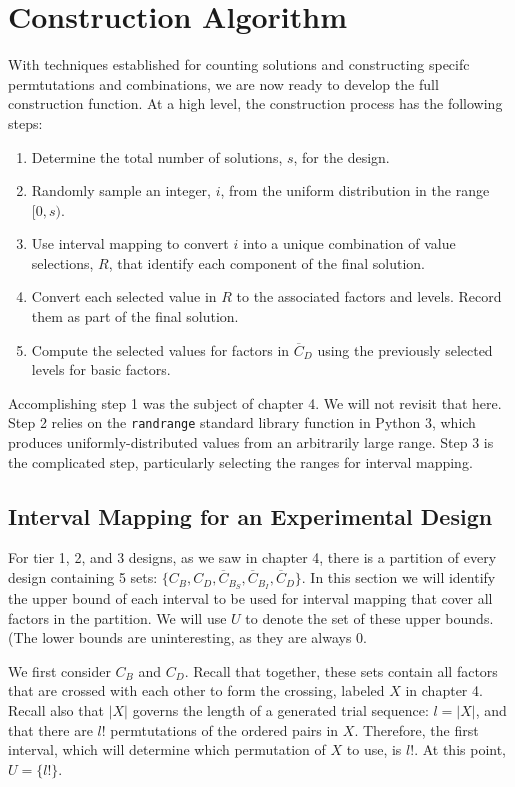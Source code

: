 \section{Construction Algorithm}

With techniques established for counting solutions and constructing specifc permtutations and combinations, we are now ready to develop the full construction function. At a high level, the construction process has the following steps:

\begin{enumerate}
\item Determine the total number of solutions, $s$, for the design.
\item Randomly sample an integer, $i$, from the uniform distribution in the range $[0, s)$.
\item Use interval mapping to convert $i$ into a unique combination of value selections, $R$, that identify each component of the final solution.
\item Convert each selected value in $R$ to the associated factors and levels. Record them as part of the final solution.
\item Compute the selected values for factors in $\overline{C}_D$ using the previously selected levels for basic factors.
\end{enumerate}

Accomplishing step 1 was the subject of chapter 4. We will not revisit that here. Step 2 relies on the \texttt{randrange} standard library function in Python 3, which produces uniformly-distributed values from an arbitrarily large range. Step 3 is the complicated step, particularly selecting the ranges for interval mapping.

\subsection{Interval Mapping for an Experimental Design}

For tier 1, 2, and 3 designs, as we saw in chapter 4, there is a partition of every design containing 5 sets: $\{C_B, C_D, \overline{C}_{B_S}, \overline{C}_{B_I}, \overline{C}_D\}$. In this section we will identify the upper bound of each interval to be used for interval mapping that cover all factors in the partition. We will use $U$ to denote the set of these upper bounds. (The lower bounds are uninteresting, as they are always $0$.

We first consider $C_B$ and $C_D$. Recall that together, these sets contain all factors that are crossed with each other to form the crossing, labeled $X$ in chapter 4. Recall also that $|X|$ governs the length of a generated trial sequence: $l = |X|$, and that there are $l!$ permtutations of the ordered pairs in $X$. Therefore, the first interval, which will determine which permutation of $X$ to use, is $l!$. At this point, $U = \{l!\}$.


